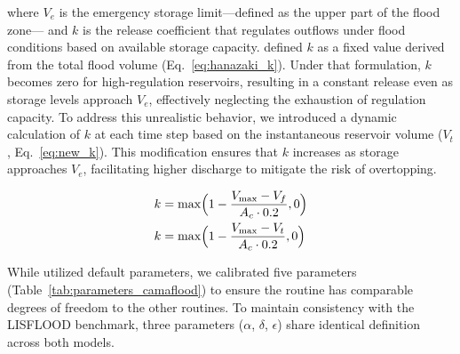 \documentclass[hess, manuscript]{copernicus}
\begin{document}
where $V_e$ is the emergency storage limit—defined as the upper part of the flood zone— and $k$ is the release coefficient that regulates outflows under flood conditions based on available storage capacity. \citet{Hanazaki2022} defined $k$ as a fixed value derived from the total flood volume (Eq.~\ref{eq:hanazaki_k}). Under that formulation, $k$ becomes zero for high-regulation reservoirs, resulting in a constant release even as storage levels approach $V_e$, effectively neglecting the exhaustion of regulation capacity. To address this unrealistic behavior, we introduced a dynamic calculation of $k$ at each time step based on the instantaneous reservoir volume ($V_t$, Eq.~\ref{eq:new_k}). This modification ensures that $k$ increases as storage approaches $V_e$, facilitating higher discharge to mitigate the risk of overtopping.

\begin{subequations}
    \label{eq:camaflood_release_coefficient}
    \begin{align}
        k &= \max \Bigl( 1 - \frac{V_{\max} - V_f}{A_{c} \cdot 0.2}, 0 \Bigr) \label{eq:hanazaki_k}\\
        k &= \max \Bigl( 1 - \frac{V_{\max} - V_t}{A_{c} \cdot 0.2}, 0 \Bigr) \label{eq:new_k}
    \end{align}
\end{subequations}




While \citet{Hanazaki2022} utilized default parameters, we calibrated five parameters (Table~\ref{tab:parameters_camaflood}) to ensure the routine has comparable degrees of freedom to the other routines. To maintain consistency with the LISFLOOD benchmark, three parameters ($\alpha$, $\delta$, $\epsilon$) share identical definition across both models.
\end{document}
